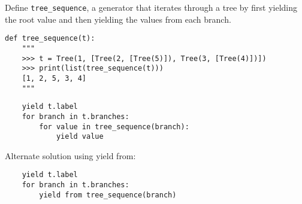 \begin{blocksection}
\question Define \lstinline$tree_sequence$, a generator that iterates through a tree by first 
yielding the root value and then yielding the values from each branch.

\begin{lstlisting}
def tree_sequence(t):
    """
    >>> t = Tree(1, [Tree(2, [Tree(5)]), Tree(3, [Tree(4)])])
    >>> print(list(tree_sequence(t)))
    [1, 2, 5, 3, 4]
    """
\end{lstlisting}

\begin{solution}[0.5in]
\begin{lstlisting}
    yield t.label
    for branch in t.branches:
        for value in tree_sequence(branch):
            yield value
\end{lstlisting}
Alternate solution using yield from:
\begin{lstlisting}
    yield t.label
    for branch in t.branches:
        yield from tree_sequence(branch)
\end{lstlisting}
\end{solution}
\end{blocksection}
